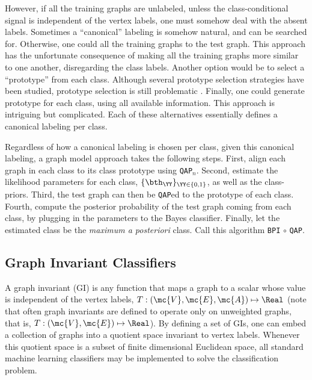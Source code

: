 \documentclass[10pt,journal,cspaper,compsoc]{IEEEtran}
\begin{document}
However, if all the training graphs are unlabeled, unless the class-conditional signal is independent of the vertex labels, one must somehow deal with the absent labels.  Sometimes a ``canonical'' labeling is somehow natural, and can be searched for.  Otherwise, one could \qap all the training graphs to the test graph.  This approach has the unfortunate consequence of making all the training graphs more similar to one another, disregarding the class labels.  Another option would be to select a ``prototype'' from each class. Although several prototype selection strategies have been studied, prototype selection is still problematic \cite{Bunke2011}.  Finally, one could generate prototype for each class, using all available information.  This approach is intriguing but complicated.  Each of these alternatives essentially defines a canonical labeling per class.

Regardless of how a canonical labeling is chosen per class, given this canonical labeling, a graph model approach takes the following steps.  First, align each graph in each class to its class prototype using \texttt{QAP}$_n$.  Second, estimate the likelihood parameters for each class, $\{\bth_{\YY}\}_{\YY \in \{0,1\}}$, as well as the class-priors. Third, the test graph can then be \texttt{QAP}ed to the prototype of each class.  Fourth, compute the posterior probability of the test graph coming from each class, by plugging in the parameters to the Bayes classifier.  Finally, let the estimated class be the \emph{maximum a posteriori} class.  Call this algorithm \texttt{BPI} $\circ$ \texttt{QAP}.


\subsection{Graph Invariant Classifiers} %
\label{sub:graph_invariants}

A graph invariant (GI) is any function that maps a graph to a scalar whose value is independent of the vertex labels, $T: (\mc{V},\mc{E},\mc{A}) \mapsto \Real$ (note that often graph invariants are defined to operate only on unweighted graphs, that is, $T: (\mc{V},\mc{E}) \mapsto \Real$).  By defining a set of GIs, one can embed a collection of graphs into a quotient space invariant to vertex labels.  Whenever this quotient space is a subset of finite dimensional Euclidean space, all standard machine learning classifiers may be implemented to solve the classification problem.  
\end{document}
